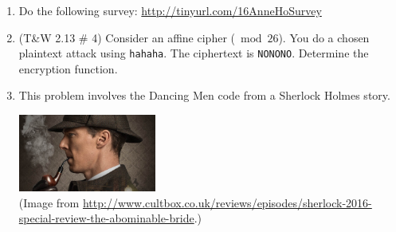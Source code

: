 \documentclass[12pt]{amsart}
\theoremstyle{plain}
\theoremstyle{definition}
\begin{document}
\begin{enumerate}[1.]
	\item Do the following survey: \url{http://tinyurl.com/16AnneHoSurvey}\\
	\item (T\&W 2.13 \# 4)  Consider an affine cipher ($\bmod 26$).  You do a chosen plaintext attack using \texttt{hahaha}.  The ciphertext is \texttt{NONONO}.  Determine the encryption function.\\ \begin{framed}\vspace{2in}\end{framed}
	 \newpage \item This problem involves the Dancing Men code from a Sherlock Holmes story.
		\begin{center}
			\includegraphics[height=1in]{Sherlock.jpg}\\
			\tiny{(Image from \url{http://www.cultbox.co.uk/reviews/episodes/sherlock-2016-special-review-the-abominable-bride}.)}
		\end{center}
		

\end{enumerate}
\end{document}
